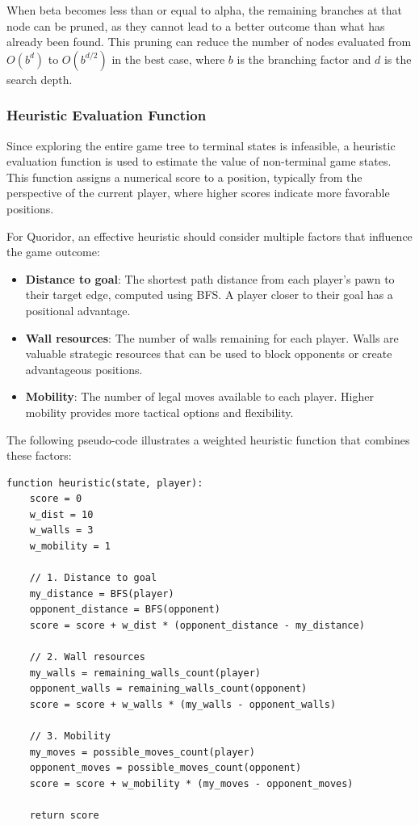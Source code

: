 \documentclass[a4paper]{article}
\begin{document}
When beta becomes less than or equal to alpha, the remaining branches at that
node can be pruned, as they cannot lead to a better outcome than what has
already been found. This pruning can reduce the number of nodes evaluated from
$O(b^d)$ to $O(b^{d/2})$ in the best case, where $b$ is the branching factor
and $d$ is the search depth.

\subsubsection{Heuristic Evaluation Function}

Since exploring the entire game tree to terminal states is infeasible, a
heuristic evaluation function is used to estimate the value of non-terminal
game states. This function assigns a numerical score to a position, typically
from the perspective of the current player, where higher scores indicate more
favorable positions.

For Quoridor, an effective heuristic should consider multiple factors that
influence the game outcome:

\begin{itemize}
  \item \textbf{Distance to goal}: The shortest path distance from each
    player's pawn to their target edge, computed using BFS. A player closer to
    their goal has a positional advantage.
  \item \textbf{Wall resources}: The number of walls remaining for each player.
    Walls are valuable strategic resources that can be used to block opponents
    or create advantageous positions.
  \item \textbf{Mobility}: The number of legal moves available to each player.
    Higher mobility provides more tactical options and flexibility.
\end{itemize}

The following pseudo-code illustrates a weighted heuristic function that
combines these factors:

\begin{verbatim}
function heuristic(state, player):
    score = 0
    w_dist = 10
    w_walls = 3
    w_mobility = 1

    // 1. Distance to goal
    my_distance = BFS(player)
    opponent_distance = BFS(opponent)
    score = score + w_dist * (opponent_distance - my_distance)
    
    // 2. Wall resources
    my_walls = remaining_walls_count(player)
    opponent_walls = remaining_walls_count(opponent)
    score = score + w_walls * (my_walls - opponent_walls)
    
    // 3. Mobility
    my_moves = possible_moves_count(player)
    opponent_moves = possible_moves_count(opponent)
    score = score + w_mobility * (my_moves - opponent_moves)
    
    return score
\end{verbatim}
\end{document}
